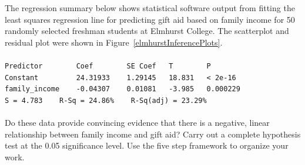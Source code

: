 \begin{examplewrap}
\begin{nexample}{
The regression summary below shows statistical software output from fitting the least squares regression line for predicting gift aid based on family income for 50 randomly selected freshman students at Elmhurst College.  The scatterplot and residual plot were shown in Figure~\ref{elmhurstInferencePlots}. 
\\
\\
\texttt{Predictor \ \ \ \ \ \ \ Coef \ \ \ \ \ \ \ SE Coef \ \ T \ \ \ \ \ \ \ P} \\
\texttt{Constant \ \ \ \ \ \ \ \  24.31933 \ \ \ 1.29145 \ \ 18.831 \ \ < 2e-16} \\
\texttt{family\_income\ \ \ \ -0.04307 \ \ \ 0.01081 \ \ -3.985 \ \ 0.000229} \\

\texttt{S = 4.783\ \ \ \ R-Sq = 24.86\% \ \ \ R-Sq(adj) = 23.29\%}
\\
\\
Do these data provide convincing evidence that there is a negative, linear relationship between family income and gift aid?  Carry out a complete hypothesis test at the 0.05 significance level.  Use the five step framework to organize your work.}


\end{nexample}
\end{examplewrap}
